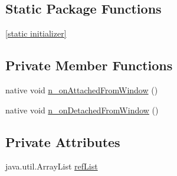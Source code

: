 \subsection*{Static Package Functions}
\begin{CompactItemize}
\item 
\hyperlink{classmono_1_1android_1_1support_1_1v7_1_1widget_1_1_content_frame_layout___on_attach_listener_implementor_e90f66d0b5473a5a0e8364f5c5bc8093}{\mbox{[}static initializer\mbox{]}}
\end{CompactItemize}
\subsection*{Private Member Functions}
\begin{CompactItemize}
\item 
native void \hyperlink{classmono_1_1android_1_1support_1_1v7_1_1widget_1_1_content_frame_layout___on_attach_listener_implementor_3e825bfedfc0c02a29343ad13576e0bc}{n\_\-onAttachedFromWindow} ()
\item 
native void \hyperlink{classmono_1_1android_1_1support_1_1v7_1_1widget_1_1_content_frame_layout___on_attach_listener_implementor_296b5828a514b9fce6469322ef00bd43}{n\_\-onDetachedFromWindow} ()
\end{CompactItemize}
\subsection*{Private Attributes}
\begin{CompactItemize}
\item 
java.util.ArrayList \hyperlink{classmono_1_1android_1_1support_1_1v7_1_1widget_1_1_content_frame_layout___on_attach_listener_implementor_be7d68fdfca3650586c9ba6cf11c0cf8}{refList}
\end{CompactItemize}


